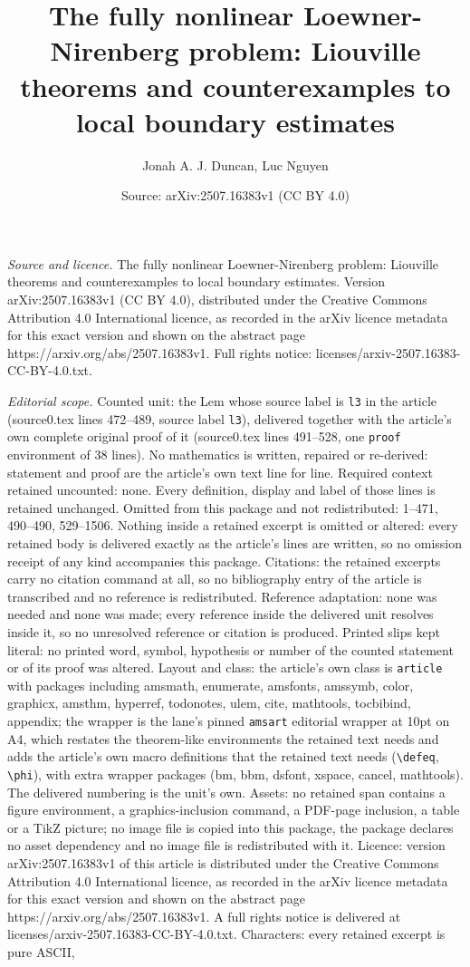\documentclass[10pt,a4paper]{amsart}
\title[The fully nonlinear Loewner-Nirenberg problem: Liouville the]{The fully nonlinear Loewner-Nirenberg problem: Liouville theorems and counterexamples to local boundary estimates}
\author{Jonah A. J. Duncan, Luc Nguyen}
\date{Source: arXiv:2507.16383v1 (CC BY 4.0)}
\begin{document}
\maketitle

\noindent\emph{Source and licence.} The fully nonlinear Loewner-Nirenberg problem: Liouville theorems and counterexamples to local boundary estimates. Version arXiv:2507.16383v1 (CC BY 4.0), distributed under the Creative Commons Attribution 4.0 International licence, as recorded in the arXiv licence metadata for this exact version and shown on the abstract page https://arxiv.org/abs/2507.16383v1. Full rights notice: licenses/arxiv-2507.16383-CC-BY-4.0.txt.\par\smallskip

\noindent\textit{Editorial scope.} Counted unit: the Lem whose source label is \texttt{l3} in the article (source0.tex lines 472--489, source label \texttt{l3}), delivered together with the article's own complete original proof of it (source0.tex lines 491--528, one \texttt{proof} environment of 38 lines). No mathematics is written, repaired or re-derived: statement and proof are the article's own text line for line. Required context retained uncounted: none. Every definition, display and label of those lines is retained unchanged. Omitted from this package and not redistributed: 1--471, 490--490, 529--1506. Nothing inside a retained excerpt is omitted or altered: every retained body is delivered exactly as the article's lines are written, so no omission receipt of any kind accompanies this package. Citations: the retained excerpts carry no citation command at all, so no bibliography entry of the article is transcribed and no reference is redistributed. Reference adaptation: none was needed and none was made; every reference inside the delivered unit resolves inside it, so no unresolved reference or citation is produced. Printed slips kept literal: no printed word, symbol, hypothesis or number of the counted statement or of its proof was altered. Layout and class: the article's own class is \texttt{article} with packages including amsmath, enumerate, amsfonts, amssymb, color, graphicx, amsthm, hyperref, todonotes, ulem, cite, mathtools, tocbibind, appendix; the wrapper is the lane's pinned \texttt{amsart} editorial wrapper at 10pt on A4, which restates the theorem-like environments the retained text needs and adds the article's own macro definitions that the retained text needs (\texttt{\textbackslash defeq}, \texttt{\textbackslash phi}), with extra wrapper packages (bm, bbm, dsfont, xspace, cancel, mathtools). The delivered numbering is the unit's own. Assets: no retained span contains a figure environment, a graphics-inclusion command, a PDF-page inclusion, a table or a TikZ picture; no image file is copied into this package, the package declares no asset dependency and no image file is redistributed with it. Licence: version arXiv:2507.16383v1 of this article is distributed under the Creative Commons Attribution 4.0 International licence, as recorded in the arXiv licence metadata for this exact version and shown on the abstract page https://arxiv.org/abs/2507.16383v1. A full rights notice is delivered at licenses/arxiv-2507.16383-CC-BY-4.0.txt. Characters: every retained excerpt is pure ASCII, 
\end{document}
